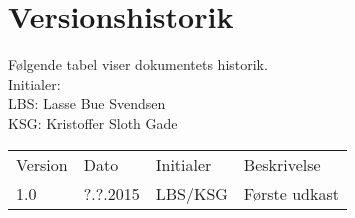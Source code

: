 \documentclass[pdftex, 11pt, a4paper, twoside, danish]{memoir}
\begin{document}
    \begin{titlingpage}
%        
    \end{titlingpage}
    
    
    \bgroup
	    \hypersetup{linkcolor=black}
	    \tableofcontents*	%
    \egroup
    \section*{Versionshistorik}
    Følgende tabel viser dokumentets historik.\\    
    Initialer:\\
    LBS: Lasse Bue Svendsen\\
    KSG: Kristoffer Sloth Gade
    \bgroup
    \def\arraystretch{1.8}
    \begin{center}
    	\begin{tabular}{lllp{186pt}}
    		\rowcolor{grey} Version	& Dato 		& Initialer & Beskrivelse \\
    		1.0	 & ?.?.2015 	& LBS/KSG	& Første udkast\\
    	\end{tabular}
    \end{center}
    \egroup
    
    
    
    
    
    
    
    


    
    \listoftodos
\end{document}
